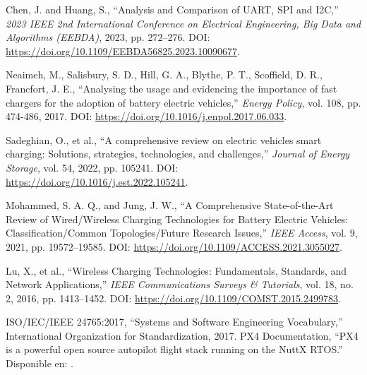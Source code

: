 \begin{thebibliography}{30}
    Chen, J. and Huang, S., ``Analysis and Comparison of UART, SPI and I2C,'' \textit{2023 IEEE 2nd International Conference on Electrical Engineering, Big Data and Algorithms (EEBDA)}, 2023, pp. 272--276. DOI: \url{https://doi.org/10.1109/EEBDA56825.2023.10090677}.

    Neaimeh, M., Salisbury, S. D., Hill, G. A., Blythe, P. T., Scoffield, D. R., Francfort, J. E., ``Analysing the usage and evidencing the importance of fast chargers for the adoption of battery electric vehicles,'' \textit{Energy Policy}, vol. 108, pp. 474-486, 2017. DOI: \url{https://doi.org/10.1016/j.enpol.2017.06.033}.

    Sadeghian, O., et al., ``A comprehensive review on electric vehicles smart charging: Solutions, strategies, technologies, and challenges,'' \textit{Journal of Energy Storage}, vol. 54, 2022, pp. 105241. DOI: \url{https://doi.org/10.1016/j.est.2022.105241}.

    Mohammed, S. A. Q., and Jung, J. W., ``A Comprehensive State-of-the-Art Review of Wired/Wireless Charging Technologies for Battery Electric Vehicles: Classification/Common Topologies/Future Research Issues,'' \textit{IEEE Access}, vol. 9, 2021, pp. 19572--19585. DOI: \url{https://doi.org/10.1109/ACCESS.2021.3055027}.

    Lu, X., et al., ``Wireless Charging Technologies: Fundamentals, Standards, and Network Applications,'' \textit{IEEE Communications Surveys \& Tutorials}, vol. 18, no. 2, 2016, pp. 1413--1452. DOI: \url{https://doi.org/10.1109/COMST.2015.2499783}.



     ISO/IEC/IEEE 24765:2017, ``Systems and Software Engineering Vocabulary,'' International Organization for Standardization, 2017.
     PX4 Documentation, ``PX4 is a powerful open source autopilot flight stack running on the NuttX RTOS.'' Disponible en: \url{}.


\end{thebibliography}
